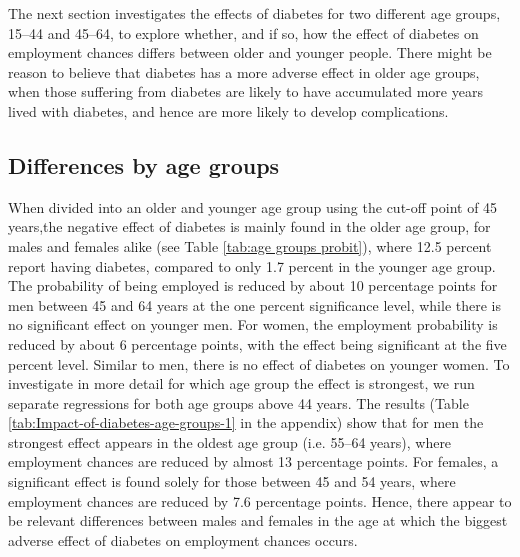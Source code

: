 The next section investigates the effects of diabetes for
two different age groups, 15--44 and 45--64, to explore whether, and
if so, how the effect of diabetes on employment chances differs between
older and younger people. There might be reason to believe that diabetes
has a more adverse effect in older age groups, when those suffering
from diabetes are likely to have accumulated more years lived with
diabetes, and hence are more likely to develop complications. 

\FloatBarrier
\subsection{Differences by age groups }

When divided into an older and younger age group using the
cut-off point of 45 years,the negative effect of diabetes is mainly
found in the older age group, for males and females alike (see Table
\ref{tab:age groups probit}), where 12.5 percent report having diabetes,
compared to only 1.7 percent in the younger age group. The probability
of being employed is reduced by about 10 percentage points for men
between 45 and 64 years at the one percent significance level, while
there is no significant effect on younger men. For women, the employment
probability is reduced by about 6 percentage points, with the effect
being significant at the five percent level. Similar to men, there
is no effect of diabetes on younger women. To investigate in more
detail for which age group the effect is strongest, we run separate
regressions for both age groups above 44 years. The results (Table
\ref{tab:Impact-of-diabetes-age-groups-1} in the appendix) show that
for men the strongest effect appears in the oldest age group (i.e.
55--64 years), where employment chances are reduced by almost 13 percentage
points. For females, a significant effect is found solely for those
between 45 and 54 years, where employment chances are reduced by 7.6
percentage points. Hence, there appear to be relevant differences
between males and females in the age at which the biggest adverse
effect of diabetes on employment chances occurs. 


